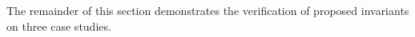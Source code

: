 %



 The remainder of this section demonstrates the verification of proposed invariants on three case studies.














